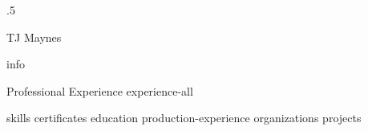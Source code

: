 \documentclass[10pt]{article}
\begin{document}
\moveleft.5\hoffset\centerline{\huge TJ Maynes}
{info}

\begin{section}{Professional Experience}
  {experience-all}
\end{section}

{skills}
{certificates}
{education}
{production-experience}
{organizations}
{projects}
\end{document}
